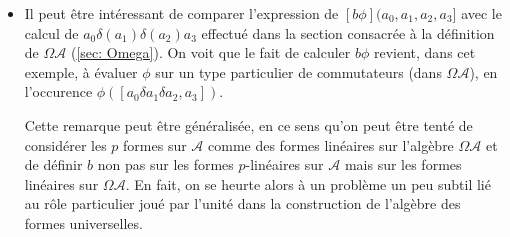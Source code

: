 \begin{itemize}
 Les deux formules ci-dessus sont diff\'erentes car il n'y a aucune 
 raison de supposer qu'un cocycle de Hochschild donn\'e  $\phi $  soit antisym\'etrique.
 \par
 Si $  \phi $   est un cobord de Hochschild, il reste \`a v\'erifier que le 
 courant de De Rham correspondant s'annule. Ceci est une cons\'equence 
 imm\'ediate de la d\'efinition de $b$ et de l'antisymm\'etrie du produit 
 ext\'erieur.\par 
 
De fa\c con g\'en\'erale, le $p$-i\`eme groupe de cohomologie de Hochschild co\"incide 
avec l'espace des courants de De Rham en degr\'e  $ p .$ 
On peut en particulier v\'erifier que la dimensionalit\'e de l'espace $  
H^p $ est triviale d\`es que  $  p $   est plus grand que la dimension de la 
vari\'et\'e $X$ elle - m\^eme.



\item
Il peut \^etre int\'eressant de comparer l'expression  de $[b\phi](a_0,a_1,a_2,a_3]$ avec le 
calcul de $  a_0\delta (a_1) \delta (a_2)  a_3 $  effectu\'e dans la 
section consacr\'ee \`a la d\'efinition de $\Omega {\mathcal A}$ 
(\ref{sec: Omega}).
On voit que le fait de calculer $b\phi $  revient, dans cet exemple, 
\`a \'evaluer $\phi$ sur un type particulier de 
commutateurs (dans $\Omega {\mathcal A} $), en l'occurence $  \phi([a_0\delta a_1\delta a_2,a_3]).$  

Cette remarque peut \^etre g\'en\'eralis\'ee, en ce sens qu'on peut 
\^etre tent\'e de consid\'erer les $p$ formes sur ${\mathcal A}$ comme des 
formes lin\'eaires sur l'alg\`ebre $ \Omega{\mathcal A}$ et de 
d\'efinir $b$ non pas sur les formes $p$-lin\'eaires sur ${\mathcal A}$ 
mais sur les formes lin\'eaires sur $ \Omega{\mathcal A}$.  En fait, on 
se heurte alors \`a un probl\`eme un peu subtil li\'e au r\^ole 
particulier jou\'e par l'unit\'e dans la construction de l'alg\`ebre 
des formes universelles.


\end{itemize}
